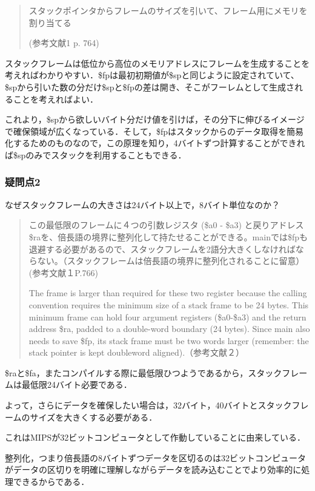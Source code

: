 \documentclass[a4j]{jarticle}
\begin{document}
\begin{quote}
スタックポインタからフレームのサイズを引いて、フレーム用にメモリを割り当てる 

(参考文献1 p. 764)
\end{quote}

スタックフレームは低位から高位のメモリアドレスにフレームを生成することを考えればわかりやすい．\$fpは最初初期値が\$spと同じように設定されていて、\$spから引いた数の分だけ\$spと\$fpの差は開き、そこがフーレムとして生成されることを考えればよい．

これより，\$spから欲しいバイト分だけ値を引けば，その分下に伸びるイメージで確保領域が広くなっている．そして，\$fpはスタックからのデータ取得を簡易化するためのものなので，この原理を知り，4バイトずつ計算することができれば\$spのみでスタックを利用することもできる．

\subsubsection{疑問点2}

なぜスタックフレームの大きさは24バイト以上で，8バイト単位なのか？  

\begin{quote}
この最低限のフレームに４つの引数レジスタ (\$a0 - \$a3) と戻りアドレス\$raを、倍長語の境界に整列化して持たせることができる。mainでは\$fpも退避する必要があるので、スタックフレームを2語分大きくしなければならない。（スタックフレームは倍長語の境界に整列化されることに留意）(参考文献１P.766)

The frame is larger than required for these two register because the calling convention requires the minimum size of a stack frame to be 24 bytes. This minimum frame can hold four argument registers (\$a0-\$a3) and the return address \$ra, padded to a double-word boundary (24 bytes). Since main also needs to save \$fp, its stack frame must be two words larger (remember: the stack pointer is kept doubleword aligned).（参考文献２）
\end{quote}

\$raと\$fa，またコンパイルする際に最低限ひつようであるから，スタックフレームは最低限24バイト必要である．

よって，さらにデータを確保したい場合は，32バイト，40バイトとスタックフレームのサイズを大きくする必要がある．

これはMIPSが32ビットコンピュータとして作動していることに由来している．

整列化，つまり倍長語の8バイトずつデータを区切るのは32ビットコンピュータがデータの区切りを明確に理解しながらデータを読み込むことでより効率的に処理できるからである．
\end{document}
